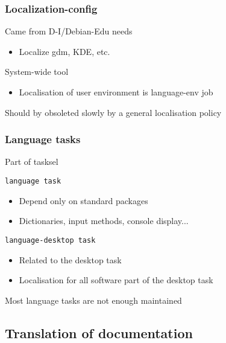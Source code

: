 \documentclass{beamer}
\begin{document}
\begin{frame}
  \frametitle{Localization-config}
	\begin{block}
		{Came from D-I/Debian-Edu needs}
		\begin{itemize}
		\item
			Localize gdm, KDE, etc.
		\end{itemize}
	\end{block}
	\begin{block}
		{System-wide tool}
		\begin{itemize}
		\item
			Localisation of user environment is language-env job
		\end{itemize}
	\end{block}
	\begin{block}
		{Should by obsoleted slowly by a general localisation policy}
	\end{block}
\end{frame}

\begin{frame}
  \frametitle{Language tasks}
	\begin{block}
		{Part of tasksel}
	\end{block}
	\begin{block}
		{\texttt{language task}}
		\begin{itemize}
		\item
			Depend only on standard packages
		\item
			Dictionaries, input methods, console display...
		\end{itemize}
	\end{block}
	\begin{block}
		{\texttt{language-desktop task}}
		\begin{itemize}
		\item
			Related to the desktop task
		\item
			Localisation for all software part of the desktop task
		\end{itemize}
	\end{block}
	\begin{block}
		{Most language tasks are not enough maintained}
	\end{block}
\end{frame}

\subsection{Translation of documentation}
\end{document}
